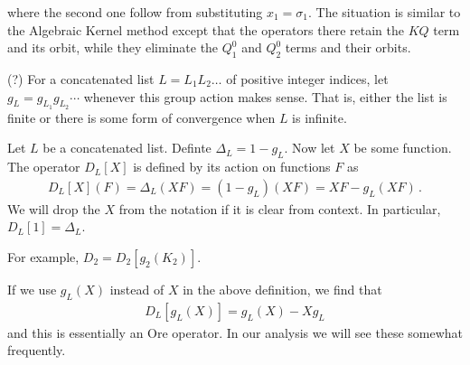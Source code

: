 where the second one follow from substituting $x_1 = \sigma_1$.
The situation is similar to the Algebraic Kernel method except that the operators there retain the $KQ$ term and its orbit, while they eliminate the $Q_1^0$ and $Q_2^0$ terms and their orbits.
\begin{definition} (?) For a concatenated list $L = L_1L_2\ldots$ of positive integer indices, let $g_L = g_{L_1}g_{L_2}\cdots$ whenever this group action makes sense. That is, either the list is finite or there is some form of convergence when $L$ is infinite.
\end{definition}
\begin{definition} Let $L$ be a concatenated list. Definte $\Delta_L = 1 - g_L$. Now let $X$ be some function. The operator $D_L[X]$ is defined by its action on functions $F$ as
\begin{align}
	D_L[X](F) =\Delta_L(XF) = (1-g_L)(XF) = XF-g_L(XF)\,.
\end{align}
We will drop the $X$ from the notation if it is clear from context. In particular, $D_L[1] = \Delta_L$.
\end{definition}
For example, $D_2 = D_2[g_2(K_2)]$.
\begin{example} If we use $g_L(X)$ instead of $X$ in the above definition, we find that
\begin{align}
	D_L[g_L(X)] = g_L(X) - Xg_L
\end{align}
and this is essentially an Ore operator. In our analysis we will see these somewhat frequently.
\end{example}
